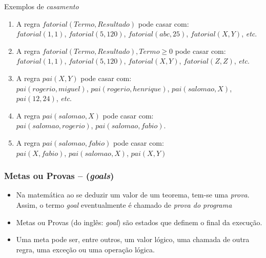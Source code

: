 \begin{frame}[fragile]
    
\begin{block}{Exemplos de \textit{casamento}}

\begin{enumerate}
	\item A regra $fatorial(Termo, Resultado)$ pode casar com:\\
    $fatorial(1,1)$, $fatorial(5,120)$, $fatorial(abc,25)$, $fatorial(X,Y)$, \emph{etc}.
    
    \pause
     \item A regra $fatorial(Termo, Resultado), Termo \geq 0$ pode casar com:\\
    $fatorial(1,1)$, $fatorial(5,120)$, $fatorial(X,Y)$, $fatorial(Z,Z)$, \emph{etc}.
    
    \pause
    \item A regra $pai(X,Y)$ pode casar com:\\
    $pai(rogerio, miguel)$, $pai(rogerio, henrique)$, $pai(salomao, X)$, $pai(12,24)$, \emph{etc}.
    
    \pause
    \item A regra $pai(salomao, X)$ pode casar com:\\
    $pai(salomao, rogerio)$, $pai(salomao, fabio)$.
    
    \pause
    \item A regra $pai(salomao, fabio)$ pode casar com:\\
    $pai(X, fabio)$, $pai(salomao, X)$, $pai(X,Y)$
\end{enumerate}

\end{block}
    
\end{frame}


\begin{frame}[fragile]

	\frametitle{Metas ou Provas -- (\textit{goals})}
	
	\begin{itemize}
	    
	 \item Na matemática ao se deduzir um valor de um teorema, tem-se uma \textit{prova}. 
	  Assim, o termo  \textit{goal} eventualmente é chamado de \textit{prova do programa}
	 
	 \pause
	    \item Metas ou Provas (do inglês: \textit{goal}) são estados que definem o final da execução.
	    
  	 \pause
	    \item Uma meta pode ser, entre outros, um valor lógico, uma chamada de outra regra, 
	    uma exceção ou uma operação lógica.
	\end{itemize}

\end{frame}
    
